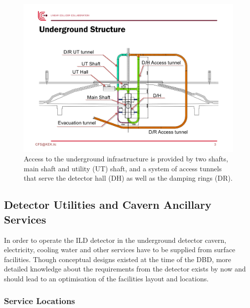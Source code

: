 \begin{figure}[h!]
\includegraphics[width=1.0\hsize]{Integration/fig/Access.pdf}
\caption{\label{fig:integration:access}Access to the underground infrastructure is provided by two shafts, main shaft and utility (UT) shaft, and a system of access tunnels~\cite{ild:bib:Access} that serve the detector hall (DH) as well as the damping rings (DR). }
\end{figure}

\subsection{Detector Utilities and Cavern Ancillary Services}


In order to operate the ILD detector in the underground detector cavern, electricity, cooling water and other services have to be supplied from surface facilities. Though conceptual designs existed at the time of the DBD, more detailed knowledge about the requirements from the detector exists by now and should lead to an optimisation of the facilities layout and locations.


\subsubsection{Service Locations}
\label{ild:sec:service_locations}

